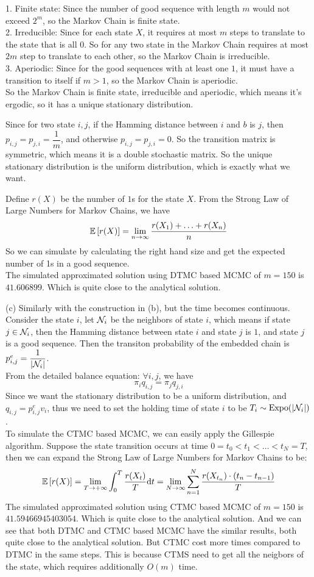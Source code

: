 \begin{homeworkProblem}
1. Finite state: Since the number of good sequence with length $m$ would not exceed $2^m$, so the Markov Chain is finite state. \\
2. Irreducible: Since for each state $X$, it requires at most $m$ steps to translate to the state that is all $0$. So for any two state in the Markov Chain requires at most $2m$ step to translate to each other, so the Markov Chain is irreducible. \\
3. Aperiodic: Since for the good sequences with at least one $1$, it must have a transition to itself if $m>1$, so the Markov Chain is aperiodic. \\
So the Markov Chain is finite state, irreducible and aperiodic, which means it's ergodic, so it has a unique stationary distribution.

Since for two state $i,j$, if the Hamming distance between $i$ and $b$ is $j$, then $p_{i,j}=p_{j,i}=\dfrac{1}{m}$, and otherwise $p_{i,j}=p_{j,i}=0$. So the transition matrix is symmetric, which means it is a double stochastic matrix. So the unique stationary distribution is the uniform distribution, which is exactly what we want.

Define $r(X)$ be the number of $1$s for the state $X$. From the Strong Law of Large Numbers for Markov Chains, we have
$$\mathbb{E}\left[r(X)\right] = \lim_{n\to\infty}\dfrac{r(X_1)+\ldots+r(X_n)}{n}$$
So we can simulate by calculating the right hand size and get the expected number of 1s in a good sequence. \\
The simulated approximated solution using DTMC based MCMC of $m = 150$ is $41.606899$. Which is quite close to the analytical solution.

(c) Similarly with the construction in (b), but the time becomes continuous. Consider the state $i$, let $\mathcal{N}_i$ be the neighbors of state $i$, which means if state $j\in\mathcal{N}_i$, then the Hamming distance between state $i$ and state $j$ is $1$, and state $j$ is a good sequence. Then the transiton probability of the embedded chain is $p_{i,j}^e=\dfrac{1}{|\mathcal{N}_i|}$. \\
From the detailed balance equation: $\forall i,j$, we have
$$\pi_i q_{i,j}=\pi_j q_{j,i}$$
Since we want the stationary distribution to be a uniform distribution, and $q_{i,j}=p_{i,j}^ev_i$, thus we need to set the holding time of state $i$ to be $T_i\sim\operatorname{Expo}(|\mathcal{N}_i|)$. \\
To simulate the CTMC based MCMC, we can easily apply the Gillespie algorithm. Suppose the state transition occurs at time $0=t_0< t_1<\ldots<t_N=T$, then we can expand the Strong Law of Large Numbers for Markov Chains to be:
$$\mathbb{E}\left[r(X)\right]=\lim_{T\to+\infty}\int_{0}^T\dfrac{r(X_t)}{T}\mathrm{d}t=\lim_{N\to\infty}\sum_{n=1}^N\dfrac{r(X_{t_n})\cdot(t_n-t_{n-1})}{T}$$
The simulated approximated solution using CTMC based MCMC of $m = 150$ is $41.59466945403054$. Which is quite close to the analytical solution. And we can see that both DTMC and CTMC based MCMC have the similar results, both quite close to the analytical solution. But CTMC cost more times compared to DTMC in the same steps. This is because CTMS need to get all the neigbors of the state, which requires additionally $O(m)$ time.

\end{homeworkProblem}

\newpage